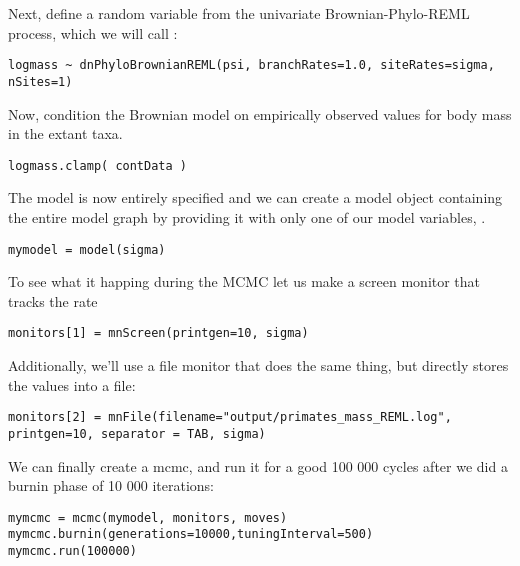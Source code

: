 Next, define a random variable from the univariate Brownian-Phylo-REML process, which we will call :
{\tt \small \begin{snugshade*}
\begin{lstlisting}
logmass ~ dnPhyloBrownianREML(psi, branchRates=1.0, siteRates=sigma, nSites=1)
\end{lstlisting}
\end{snugshade*}}
Now, condition the Brownian model on empirically observed values for body mass in the extant taxa.
{\tt \small \begin{snugshade*}
\begin{lstlisting}
logmass.clamp( contData )
\end{lstlisting}
\end{snugshade*}}

The model is now entirely specified and we can create a model object containing the entire model graph by providing it with only one of our model variables, \EG {}. 
{\tt \small \begin{snugshade*}
\begin{lstlisting}
mymodel = model(sigma)
\end{lstlisting}
\end{snugshade*}}

To see what it happing during the MCMC let us make a screen monitor that tracks the rate 
{\tt \small \begin{snugshade*}
\begin{lstlisting}
monitors[1] = mnScreen(printgen=10, sigma)
\end{lstlisting}
\end{snugshade*}}

Additionally, we'll use a file monitor that does the same thing, but directly stores the values into a file:
{\tt \small \begin{snugshade*}
\begin{lstlisting}
monitors[2] = mnFile(filename="output/primates_mass_REML.log", printgen=10, separator = TAB, sigma)
\end{lstlisting}
\end{snugshade*}}

We can finally create a mcmc, and run it for a good 100 000 cycles after we did a burnin phase of 10 000 iterations:
{\tt \small \begin{snugshade*}
\begin{lstlisting}
mymcmc = mcmc(mymodel, monitors, moves)
mymcmc.burnin(generations=10000,tuningInterval=500)
mymcmc.run(100000)
\end{lstlisting}
\end{snugshade*}}




